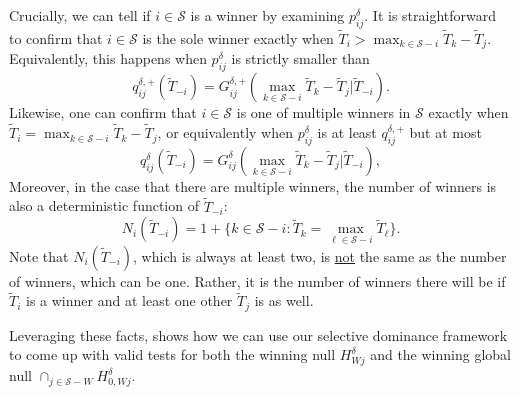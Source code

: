 \documentclass{article}
\begin{document}
Crucially, we can tell if $i \in \mathcal{S}$ is a winner by examining $p^{\delta}_{ij}$. It is straightforward to confirm that $i \in \mathcal{S}$ is the sole winner exactly when $\widetilde{T}_i > \max_{k \in \mathcal{S} - i} \widetilde{T}_k - \widetilde{T}_j $. Equivalently, this happens when $p^{\delta}_{ij}$ is strictly smaller than 
\begin{equation}
    \label{eq:rank_verification_lower}
    q^{\delta, +}_{ij}(\widetilde{T}_{-i}) = G^{\delta, +}_{ij}(\max_{k \in \mathcal{S} - i} \widetilde{T}_k - \widetilde{T}_j | \widetilde{T}_{-i}).
\end{equation}
Likewise, one can confirm that $i \in \mathcal{S}$ is one of multiple winners in $\mathcal{S}$ exactly when $\widetilde{T}_i = \max_{k \in \mathcal{S} - i} \widetilde{T}_k - \widetilde{T}_j$, or equivalently when $p^{\delta}_{ij}$ is at least $q^{\delta, +}_{ij}$ but at most 
\begin{equation}
    \label{eq:rank_verification_upper}
    q^{\delta}_{ij}(\widetilde{T}_{-i}) = G^{\delta}_{ij}(\max_{k \in \mathcal{S} - i} \widetilde{T}_k - \widetilde{T}_j | \widetilde{T}_{-i}),
\end{equation}
Moreover, in the case that there are multiple winners, the number of winners is also a deterministic function of $\widetilde{T}_{-i}$:
\begin{equation}
    \label{eq:rank_verification_num_ties}
    N_{i}(\widetilde{T}_{-i}) = 1 + \{ k \in \mathcal{S} - i : \widetilde{T}_k = \max_{\ell \in \mathcal{S} - i} \widetilde{T}_{\ell} \}.
\end{equation}
Note that $N_{i}(\widetilde{T}_{-i})$, which is always at least two, is \underline{not} the same as the number of winners, which can be one. Rather, it is the number of winners there will be if $\widetilde{T}_i$ is a winner and at least one other $\widetilde{T}_j$ is as well.  

Leveraging these facts,  shows how we can use our selective dominance framework to come up with valid tests for both the winning null $H^{\delta}_{Wj}$ and the winning global null  $\cap_{j \in \mathcal{S} - W} H^{\delta}_{0, Wj}$. 
\end{document}
